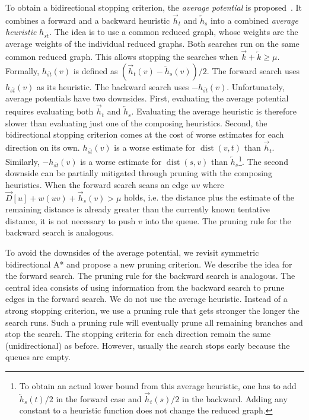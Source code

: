 \documentclass[manuscript,review]{acmart}
\newcommand*{\dist}{\operatorname{dist}}
\begin{document}
To obtain a bidirectional stopping criterion, the \emph{average potential} is proposed~\cite{gh-cspas-05}.
It combines a forward and a backward heuristic $\overrightarrow{h}_t$ and $\overleftarrow{h}_s$ into a combined \emph{average heuristic} $h_{\overline{st}}$.
The idea is to use a common reduced graph, whose weights are the average weights of the individual reduced graphs.
Both searches run on the same common reduced graph.
This allows stopping the searches when $\overrightarrow{k} + \overleftarrow{k} \geq \mu$.
Formally, $h_{\overline{st}}(v)$ is defined as $(\overrightarrow{h}_t(v) - \overleftarrow{h}_s(v))/2$.
The forward search uses $h_{\overline{st}}(v)$ as its heuristic.
The backward search uses $-h_{\overline{st}}(v)$.
Unfortunately, average potentials have two downsides.
First, evaluating the average potential requires evaluating both $\overrightarrow{h}_t$ and $\overleftarrow{h}_s$.
Evaluating the average heuristic is therefore slower than evaluating just one of the composing heuristics.
Second, the bidirectional stopping criterion comes at the cost of worse estimates for each direction on its own.
$h_{\overline{st}}(v)$ is a worse estimate for $\dist(v,t)$ than $\overrightarrow{h}_t$.
Similarly, $-h_{\overline{st}}(v)$ is a worse estimate for $\dist(s,v)$ than $\overleftarrow{h}_s$\footnote{
To obtain an actual lower bound from this average heuristic, one has to add $\overleftarrow{h}_s(t)/2$ in the forward case and $\overrightarrow{h}_t(s)/2$ in the backward.
Adding any constant to a heuristic function does not change the reduced graph.
}.
The second downside can be partially mitigated through pruning with the composing heuristics.
When the forward search scans an edge $uv$ where $\overrightarrow{D}[u] + w(uv) + \overrightarrow{h}_s(v) > \mu$ holds, i.e. the distance plus the estimate of the remaining distance is already greater than the currently known tentative distance, it is not necessary to push $v$ into the queue.
The pruning rule for the backward search is analogous.

To avoid the downsides of the average potential, we revisit symmetric bidirectional A* and propose a new pruning criterion.
We describe the idea for the forward search.
The pruning rule for the backward search is analogous.
The central idea consists of using information from the backward search to prune edges in the forward search.
We do not use the average heuristic.
Instead of a strong stopping criterion, we use a pruning rule that gets stronger the longer the search runs.
Such a pruning rule will eventually prune all remaining branches and stop the search.
The stopping criteria for each direction remain the same (unidirectional) as before.
However, usually the search stops early because the queues are empty.
\end{document}
